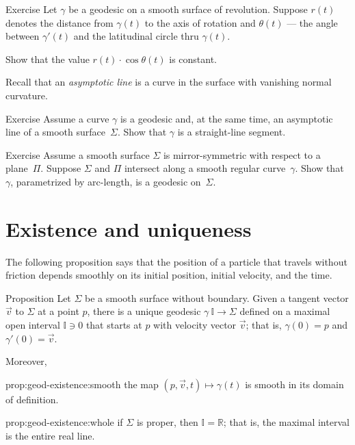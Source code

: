 \begin{thm}{Exercise}\label{ex:clairaut}
Let $\gamma$ be a geodesic on a smooth surface of revolution.
Suppose $r(t)$ denotes the distance from $\gamma(t)$ to the axis of rotation
and $\theta(t)$ --- the angle between $\gamma'(t)$ and the latitudinal circle thru $\gamma(t)$. 

Show that the value $r(t)\cdot \cos\theta(t)$ is constant. 
\end{thm}


Recall that an {}\emph{asymptotic line} is a curve in the surface with vanishing normal curvature.

\begin{thm}{Exercise}\label{ex:asymptotic-geodesic}
Assume a curve $\gamma$ is a geodesic and, at the same time, an asymptotic line of a smooth surface~$\Sigma$.
Show that $\gamma$ is a straight-line segment.
\end{thm}


\begin{thm}{Exercise}\label{ex:reflection-geodesic}
Assume a smooth surface $\Sigma$ is mirror-symmetric with respect to a plane~$\Pi$.
Suppose $\Sigma$ and $\Pi$ intersect along a smooth regular curve~$\gamma$.
Show that $\gamma$, parametrized by arc-length, is a geodesic on~$\Sigma$.
\end{thm}



\section{Existence and uniqueness}

The following proposition says that the position of a particle that travels without friction depends smoothly on its initial position, initial velocity, and the time. 



\begin{thm}{Proposition}\label{prop:geod-existence} 
Let $\Sigma$ be a smooth surface without boundary.
Given a tangent vector ${\vec v}$ to $\Sigma$ at a point $p$,
there is a unique geodesic $\gamma\:\mathbb{I}\to \Sigma$ defined on a maximal open interval $\mathbb{I}\ni 0$ that starts at $p$ with velocity vector ${\vec v}$;
that is, $\gamma(0)=p$ and $\gamma'(0)={\vec v}$.

Moreover,
\begin{subthm}{prop:geod-existence:smooth} the map $(p,{\vec v},t)\mapsto \gamma(t)$ is smooth in its domain of definition.
\end{subthm}

\begin{subthm}{prop:geod-existence:whole} if $\Sigma$ is proper, then $\mathbb{I}=\mathbb{R}$; that is, the maximal interval is the entire real line.
\end{subthm}

\end{thm}

